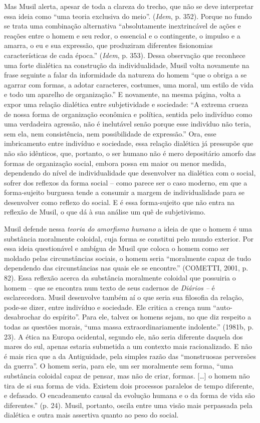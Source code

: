 Mas Musil alerta, apesar de toda a clareza do trecho, que não se deve
interpretar essa ideia como ``uma teoria exclusiva do meio''.
(\emph{Idem}, p. 352). Porque no fundo se trata uma combinação
alternativa ``absolutamente inextrincável de ações e reações entre o
homem e seu redor, o essencial e o contingente, o impulso e a amarra, o
eu e sua expressão, que produziram diferentes fisionomias
características de cada época.'' (\emph{Idem}, p. 353). Dessa observação
que reconhece uma forte dialética na construção da individualidade,
Musil volta novamente na frase seguinte a falar da informidade da
natureza do homem ``que o obriga a se agarrar com formas, a adotar
caracteres, costumes, uma moral, um estilo de vida e todo um aparelho de
organização.'' E novamente, na mesma página, volta a expor uma relação
dialética entre subjetividade e sociedade: ``A extrema crueza de nossa
forma de organização econômica e política, sentida pelo indivíduo como
uma verdadeira agressão, não é inelutável senão porque esse indivíduo
não teria, sem ela, nem consistência, nem possibilidade de expressão.''
Ora, esse imbricamento entre indivíduo e sociedade, essa relação
dialética já pressupõe que não são idênticos, que, portanto, o ser
humano não é mero depositário amorfo das formas de organização social,
embora possa em maior ou menor medida, dependendo do nível de
individualidade que desenvolver na dialética com o social, sofrer dos
reflexos da forma social -- como parece ser o caso moderno, em que a
forma-sujeito burguesa tende a consumir a margem de individualidade para
se desenvolver como reflexo do social. E é essa forma-sujeito que não
entra na reflexão de Musil, o que dá à sua análise um quê de
subjetivismo.

Musil defende nessa \emph{teoria do amorfismo humano} a ideia de que o
homem é uma substância moralmente coloidal, cuja forma se constitui pelo
mundo exterior. Por essa ideia questionável e ambígua de Musil que
coloca o homem como ser moldado pelas circunstâncias sociais, o homem
seria ``moralmente capaz de tudo dependendo das circunstâncias nas quais
ele se encontre.'' (COMETTI, 2001, p. 82). Essa reflexão acerca da
substância moralmente coloidal que possuiria o homem -- que se encontra
num texto de seus cadernos de \emph{Diários --} é esclarecedora. Musil
desenvolve também aí o que seria sua filosofia da relação, pode-se
dizer, entre indivíduo e sociedade. Ele critica a crença num
``auto-desabrochar do espírito''. Para ele, talvez os homens sejam, no
que diz respeito a todas as questões morais, ``uma massa
extraordinariamente indolente.'' (1981b, p. 23). A ética na Europa
ocidental, segundo ele, não seria diferente daquela dos mares do sul,
apenas estaria submetida a um contexto mais racionalizado. E não é mais
rica que a da Antiguidade, pela simples razão das ``monstruosas
perversões da guerra''. O homem seria, para ele, um ser moralmente sem
forma, ``uma substância coloidal capaz de pensar, mas não de criar,
formas. {[}\ldots{}{]} o homem não tira de si sua forma de vida. Existem
dois processos paralelos de tempo diferente, e defasado. O encadeamento
causal da evolução humana e o da forma de vida são diferentes.'' (p.
24). Musil, portanto, oscila entre uma visão mais perpassada pela
dialética e outra mais assertiva quanto ao peso do social.


